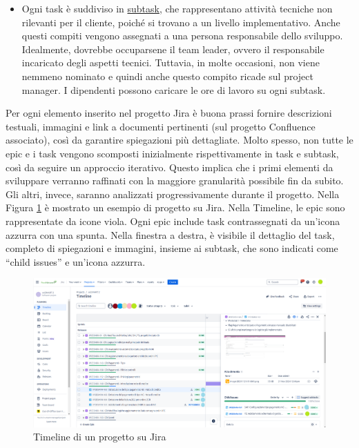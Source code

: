 \begin{itemize}
            \item Ogni task è suddiviso in \underline{subtask}, che rappresentano attività tecniche non rilevanti per il cliente, poiché si trovano a un livello
            implementativo. Anche questi compiti vengono assegnati a una persona responsabile dello sviluppo. Idealmente, dovrebbe occuparsene il team leader, ovvero il
            responsabile incaricato degli aspetti tecnici. Tuttavia, in molte occasioni, non viene nemmeno
            nominato e quindi anche questo compito ricade sul project manager. I dipendenti possono caricare le ore di lavoro su ogni subtask.
        \end{itemize}

        Per ogni elemento inserito nel progetto Jira è buona prassi fornire descrizioni testuali, immagini e link a documenti pertinenti
        (sul progetto Confluence associato), così da garantire spiegazioni più dettagliate.
        Molto spesso, non tutte le epic e i task vengono scomposti inizialmente rispettivamente in task e subtask, così da seguire un approccio iterativo.
        Questo implica che i primi elementi da sviluppare verranno raffinati con la maggiore granularità possibile fin da subito. Gli altri, invece,
        saranno analizzati progressivamente durante il progetto.
        Nella Figura \ref{fig:timeline-jira-progetto} è mostrato un esempio di progetto su Jira. Nella Timeline, le epic sono rappresentate da icone viola. Ogni epic include task
        contrassegnati da un'icona azzurra con una spunta. Nella finestra a destra, è visibile il dettaglio del task, completo di spiegazioni e immagini,
        insieme ai subtask, che sono indicati come “child issues” e un'icona azzurra.
        
        \begin{figure}
            \centering
            \includegraphics[width=\linewidth]{figures/timelineJira.png}
            \caption{Timeline di un progetto su Jira}
            \label{fig:timeline-jira-progetto}
        \end{figure}

